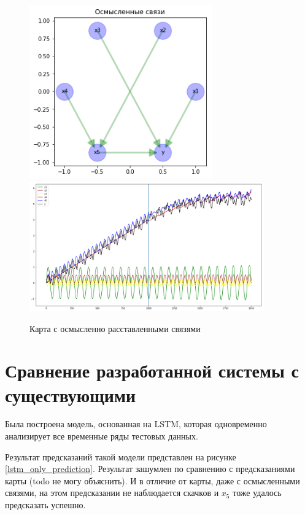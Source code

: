 \begin{figure}
	\centering
	\includegraphics[width=0.7\textwidth]{./img/lstmfcm_meaningful.png}
	\includegraphics[width=0.9\textwidth]{./img/lstmfcm_meaningful_prediction.png}
	\caption{Карта с осмысленно расставленными связями}
	\label{pic:lstmfcm_meaningful}
\end{figure}


\section{Сравнение разработанной системы с существующими}

Была построена модель, основанная на LSTM,
которая одновременно анализирует все временные ряды тестовых данных.

Результат предсказаний такой модели представлен на рисунке \ref{lstm_only_prediction}.
Результат зашумлен по сравнению с предсказаниями карты (todo не могу объяснить).
И в отличие от карты, даже с осмысленными связями, на этом предсказании не наблюдается скачков
и $ x_5 $ тоже удалось предсказать успешно.

